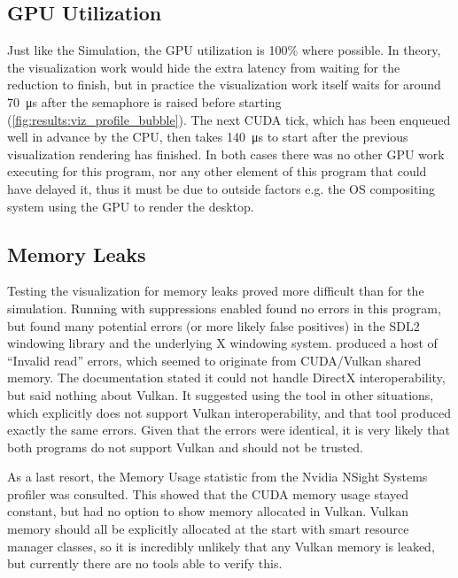 

\subsection{GPU Utilization}\label{sec:Results:Viz:Efficiency}

Just like the Simulation, the GPU utilization is 100\% where possible.
In theory, the visualization work would hide the extra latency from waiting for the reduction to finish, but in practice the visualization work itself waits for around \SI{70}{\micro\second} after the semaphore is raised before starting (\cref{fig:results:viz_profile_bubble}).
The next CUDA tick, which has been enqueued well in advance by the CPU, then takes \SI{140}{\micro\second} to start after the previous visualization rendering has finished.
In both cases there was no other GPU work executing for this program, nor any other element of this program that could have delayed it, thus it must be due to outside factors e.g. the OS compositing system using the GPU to render the desktop.


\subsection{Memory Leaks}\label{sec:Results:Viz:Memory}
Testing the visualization for memory leaks proved more difficult than for the simulation.
Running  with suppressions enabled found no errors in this program, but found many potential errors (or more likely false positives) in the SDL2 windowing library and the underlying X windowing system.
 produced a host of ``Invalid read'' errors, which seemed to originate from CUDA/Vulkan shared memory.
The documentation stated it could not handle DirectX interoperability\cite{NvidiaCudaMemcheckIssues}, but said nothing about Vulkan.
It suggested using the  tool in other situations, which explicitly does not support Vulkan interoperability\cite{NvidiaComputeSanitizerRelease}, and that tool produced exactly the same errors.
Given that the errors were identical, it is very likely that both programs do not support Vulkan and should not be trusted.

As a last resort, the Memory Usage statistic from the Nvidia NSight Systems profiler was consulted.
This showed that the CUDA memory usage stayed constant, but had no option to show memory allocated in Vulkan.
Vulkan memory should all be explicitly allocated at the start with smart resource manager classes, so it is incredibly unlikely that any Vulkan memory is leaked, but currently there are no tools able to verify this.